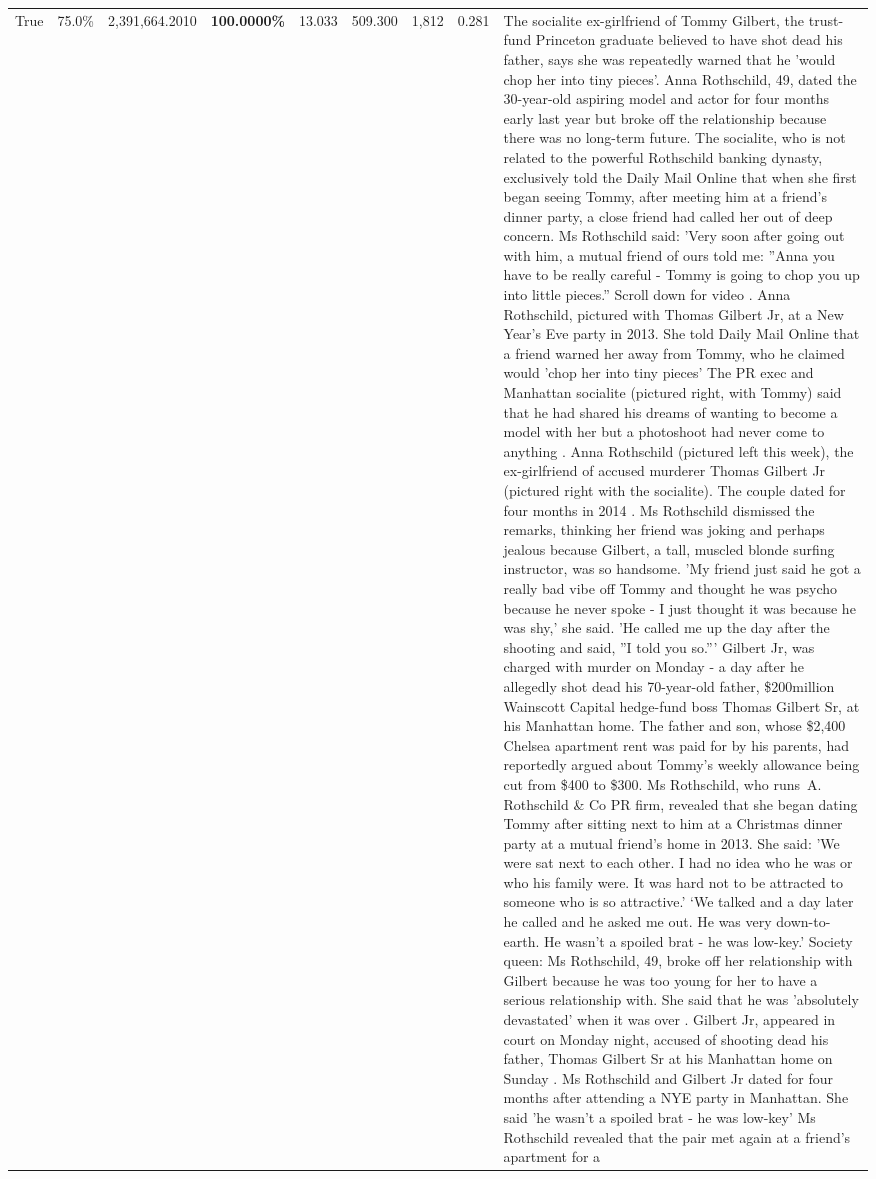 \begin{table}[H]
\begin{tabular}{lllrlllll}
True & 75.0\% & 2,391,664.2010 & \bfseries \color{red} 100.0000\% & 13.033 & 509.300 & 1,812 & 0.281 & The socialite ex-girlfriend of Tommy Gilbert, the trust-fund Princeton graduate believed to have shot dead his father, says she was repeatedly warned that he 'would chop her into tiny pieces'. Anna Rothschild, 49, dated the 30-year-old aspiring model and actor for four months early last year but broke off the relationship because there was no long-term future. The socialite, who is not related to the powerful Rothschild banking dynasty, exclusively told the Daily Mail Online that when she first began seeing Tommy, after meeting him at a friend's dinner party, a close friend had called her out of deep concern. Ms Rothschild said: 'Very soon after going out with him, a mutual friend of ours told me: ''Anna you have to be really careful - Tommy is going to chop you up into little pieces.'' Scroll down for video . Anna Rothschild, pictured with Thomas Gilbert Jr, at a New Year's Eve party in 2013. She told Daily Mail Online that a friend warned her away from Tommy, who he claimed would 'chop her into tiny pieces' The PR exec and Manhattan socialite (pictured right, with Tommy) said that he had shared his dreams of wanting to become a model with her but a photoshoot had never come to anything . Anna Rothschild (pictured left this week), the ex-girlfriend of accused murderer Thomas Gilbert Jr (pictured right with the socialite). The couple dated for four months in 2014 . Ms Rothschild dismissed the remarks, thinking her friend was joking and perhaps jealous because Gilbert, a tall, muscled blonde surfing instructor, was so handsome. 'My friend just said he got a really bad vibe off Tommy and thought he was psycho because he never spoke - I just thought it was because he was shy,' she said. 'He called me up the day after the shooting and said, ''I told you so.''' Gilbert Jr, was charged with murder on Monday - a day after he allegedly shot dead his 70-year-old father, \$200million Wainscott Capital hedge-fund boss Thomas Gilbert Sr, at his Manhattan home. The father and son, whose \$2,400 Chelsea apartment rent was paid for by his parents, had reportedly argued about Tommy's weekly allowance being cut from \$400 to \$300. Ms Rothschild, who runs A. Rothschild \& Co PR firm, revealed that she began dating Tommy after sitting next to him at a Christmas dinner party at a mutual friend's home in 2013. She said: 'We were sat next to each other. I had no idea who he was or who his family were. It was hard not to be attracted to someone who is so attractive.' ‘We talked and a day later he called and he asked me out. He was very down-to-earth. He wasn’t a spoiled brat - he was low-key.’ Society queen: Ms Rothschild, 49, broke off her relationship with Gilbert because he was too young for her to have a serious relationship with. She said that he was 'absolutely devastated' when it was over . Gilbert Jr, appeared in court on Monday night, accused of shooting dead his father, Thomas Gilbert Sr at his Manhattan home on Sunday . Ms Rothschild and Gilbert Jr dated for four months after attending a NYE party in Manhattan. She said 'he wasn't a spoiled brat - he was low-key' Ms Rothschild revealed that the pair met again at a friend’s apartment for a 
\end{tabular}
\end{table}
